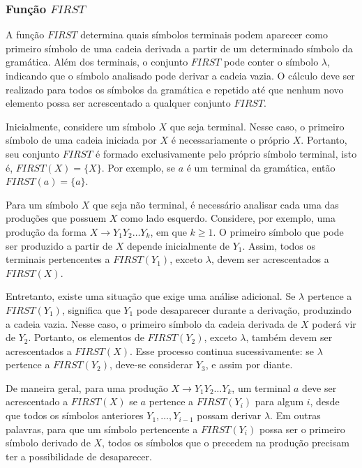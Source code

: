 \documentclass[
  brazilian,
  letterpaper,
]{book}
\theoremstyle{plain}
\theoremstyle{definition}
\theoremstyle{remark}
\begin{document}
\subsubsection{\texorpdfstring{Função
\(FIRST\)}{Função FIRST}}\label{funuxe7uxe3o-first}

A função \(FIRST\) determina quais símbolos terminais podem aparecer
como primeiro símbolo de uma cadeia derivada a partir de um determinado
símbolo da gramática. Além dos terminais, o conjunto \(FIRST\) pode
conter o símbolo \(\lambda\), indicando que o símbolo analisado pode
derivar a cadeia vazia. O cálculo deve ser realizado para todos os
símbolos da gramática e repetido até que nenhum novo elemento possa ser
acrescentado a qualquer conjunto \(FIRST\).

Inicialmente, considere um símbolo \(X\) que seja terminal. Nesse caso,
o primeiro símbolo de uma cadeia iniciada por \(X\) é necessariamente o
próprio \(X\). Portanto, seu conjunto \(FIRST\) é formado exclusivamente
pelo próprio símbolo terminal, isto é, \(FIRST(X)=\{X\}\). Por exemplo,
se \(a\) é um terminal da gramática, então \(FIRST(a)=\{a\}\).

Para um símbolo \(X\) que seja não terminal, é necessário analisar cada
uma das produções que possuem \(X\) como lado esquerdo. Considere, por
exemplo, uma produção da forma \(X\rightarrow Y_1Y_2\ldots Y_k\), em que
\(k\geq1\). O primeiro símbolo que pode ser produzido a partir de \(X\)
depende inicialmente de \(Y_1\). Assim, todos os terminais pertencentes
a \(FIRST(Y_1)\), exceto \(\lambda\), devem ser acrescentados a
\(FIRST(X)\).

Entretanto, existe uma situação que exige uma análise adicional. Se
\(\lambda\) pertence a \(FIRST(Y_1)\), significa que \(Y_1\) pode
desaparecer durante a derivação, produzindo a cadeia vazia. Nesse caso,
o primeiro símbolo da cadeia derivada de \(X\) poderá vir de \(Y_2\).
Portanto, os elementos de \(FIRST(Y_2)\), exceto \(\lambda\), também
devem ser acrescentados a \(FIRST(X)\). Esse processo continua
sucessivamente: se \(\lambda\) pertence a \(FIRST(Y_2)\), deve-se
considerar \(Y_3\), e assim por diante.

De maneira geral, para uma produção \(X\rightarrow Y_1Y_2\ldots Y_k\),
um terminal \(a\) deve ser acrescentado a \(FIRST(X)\) se \(a\) pertence
a \(FIRST(Y_i)\) para algum \(i\), desde que todos os símbolos
anteriores \(Y_1,\ldots,Y_{i-1}\) possam derivar \(\lambda\). Em outras
palavras, para que um símbolo pertencente a \(FIRST(Y_i)\) possa ser o
primeiro símbolo derivado de \(X\), todos os símbolos que o precedem na
produção precisam ter a possibilidade de desaparecer.
\end{document}
